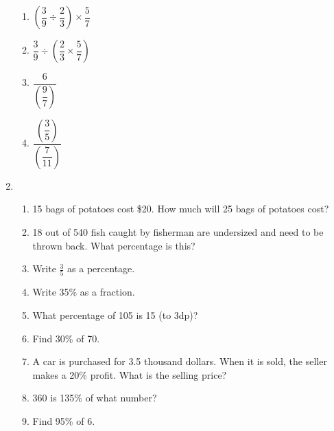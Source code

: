 \documentclass{amsbook}
\begin{document}
\begin{enumerate}
\begin{enumerate}
      \item $ \left(\dfrac{3}{9} \div \dfrac{2}{3}\right) \times \dfrac{5}{7} $
      \item $ \dfrac{3}{9} \div \left(\dfrac{2}{3} \times \dfrac{5}{7}\right) $
      \item $ \dfrac{6}{\left(\dfrac{9}{7}\right)} $
      \item $ \dfrac{\left(\dfrac{3}{5}\right)}{\left(\dfrac{7}{11}\right)} $
    \end{enumerate}
  \item
    \begin{enumerate}
      \item 15 bags of potatoes cost \$20. How much will 25 bags of potatoes cost?
      \item 18 out of 540 fish caught by fisherman are undersized and need to be thrown back. What percentage is this?
      \item Write $ \frac{3}{5} $ as a percentage.
      \item Write 35\% as a fraction.
      \item What percentage of 105 is 15 (to 3dp)?
      \item Find 30\% of 70.
      \item A car is purchased for 3.5 thousand dollars. When it is sold, the seller makes a 20\% profit. What is the selling price?
      \item 360 is 135\% of what number?
      \item Find 95\% of 6.
    \end{enumerate}
\end{enumerate}
\end{document}

